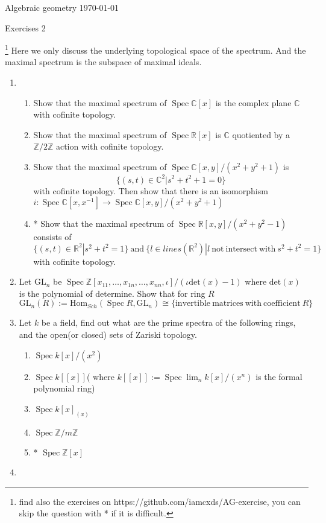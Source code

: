 \documentclass[a4paper,11pt]{article}
\def\bb#1{\mathbb{#1}}
\def\bZ{\mathbb{Z}}
\def\Zmd#1{\bZ/#1\bZ}
\def\mrm#1{\mathrm{#1}}
\def\Hom{\mathrm{Hom}}
\DeclareMathOperator{\Spec}{Spec}
\begin{document}
{\small Algebraic geometry \hfill \today \\}
\begin{center}
\Huge Exercises 2
\end{center}

\vskip0.6cm
\footnote{find also the exercises on https://github.com/iamcxds/AG-exercise, you can skip the question with * if it is difficult.}
Here we only discuss the underlying topological space of the spectrum. And the maximal spectrum is the subspace of maximal ideals.
\begin{enumerate}[1.]
\item 
\begin{enumerate}
    \item Show that the maximal spectrum of $\Spec\bb{C}[x]$ is the complex plane $\bb{C}$ with cofinite topology.
    \item Show that the maximal spectrum of $\Spec \bb{R}[x]$ is $\bb{C}$ quotiented by a $\Zmd{2}$ action with cofinite topology.
    \item Show that the maximal spectrum of $\Spec \bb{C}[x,y]/(x^2+y^2+1)$ is 
    \[\{(s,t)\in \bb{C}^2|s^2+t^2+1=0\}\] with cofinite topology. Then show that there is an isomorphism $i: \Spec \bb{C}[x,x^{-1}] \to \Spec \bb{C}[x,y]/(x^2+y^2+1)$
    \item* Show that the maximal spectrum of $\Spec \bb{R}[x,y]/(x^2+y^2-1)$ consists of 
    \[\{(s,t)\in \bb{R}^2|s^2+t^2=1\} \mrm{ \ and\ } \{ l\in lines(\bb{R}^2)|l\mrm{ \ not \ intersect\ with\ } s^2+t^2=1\} \] 
    with cofinite topology.
    
\end{enumerate}
\item Let $\mrm{GL}_n$ be $ \Spec \bZ[x_{11},\ldots,x_{1n},\ldots,x_{nn},\iota]/(\iota\mrm{det}(x)-1) $ where $\mrm{det}(x)$ is the polynomial of determine. Show that for ring $R$ \[\mrm{GL}_n(R):=\Hom_{Sch}(\Spec R, \mrm{GL}_n)\cong 
\{\mrm{ invertible\ matrices\ with\ coefficient\ } R\} \]
\item Let $k$ be a field, find out what are the prime spectra of the following rings, and the open(or closed) sets of Zariski topology.
\begin{enumerate}
    \item  $\Spec k[x]/(x^2)$
    \item  $\Spec k[[x]]$( where $k[[x]] :=\Spec \lim_n k[x]/(x^n)$ is the formal polynomial ring)
    \item  $\Spec k[x]_{(x)}$
    \item $\Spec \Zmd{m}$
    \item*  $\Spec \bZ[x]$
\end{enumerate}
\item 




\end{enumerate}
\end{document}
